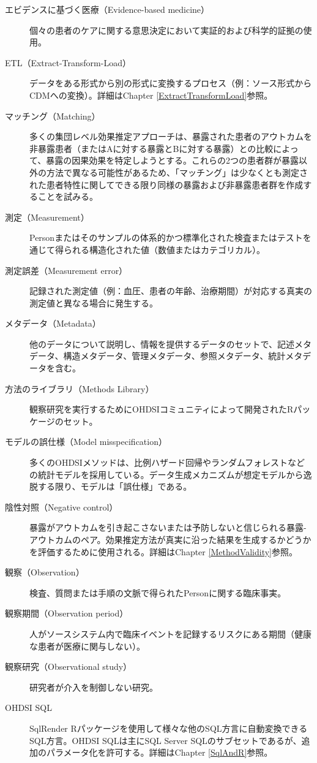 \documentclass[
  11pt]{book}
\theoremstyle{definition}
\theoremstyle{definition}
\theoremstyle{definition}
\theoremstyle{definition}
\theoremstyle{remark}
\begin{document}
\begin{description}
\item[エビデンスに基づく医療（Evidence-based medicine）]
個々の患者のケアに関する意思決定において実証的および科学的証拠の使用。
\item[ETL（Extract-Transform-Load）]
データをある形式から別の形式に変換するプロセス（例：ソース形式からCDMへの変換）。詳細はChapter \ref{ExtractTransformLoad}参照。
\item[マッチング（Matching）]
多くの集団レベル効果推定アプローチは、暴露された患者のアウトカムを非暴露患者（またはAに対する暴露とBに対する暴露）との比較によって、暴露の因果効果を特定しようとする。これらの2つの患者群が暴露以外の方法で異なる可能性があるため、「マッチング」は少なくとも測定された患者特性に関してできる限り同様の暴露および非暴露患者群を作成することを試みる。
\item[測定（Measurement）]
Personまたはそのサンプルの体系的かつ標準化された検査またはテストを通じて得られる構造化された値（数値またはカテゴリカル）。
\item[測定誤差（Measurement error）]
記録された測定値（例：血圧、患者の年齢、治療期間）が対応する真実の測定値と異なる場合に発生する。
\item[メタデータ（Metadata）]
他のデータについて説明し、情報を提供するデータのセットで、記述メタデータ、構造メタデータ、管理メタデータ、参照メタデータ、統計メタデータを含む。
\item[方法のライブラリ（Methods Library）]
観察研究を実行するためにOHDSIコミュニティによって開発されたRパッケージのセット。
\item[モデルの誤仕様（Model misspecification）]
多くのOHDSIメソッドは、比例ハザード回帰やランダムフォレストなどの統計モデルを採用している。データ生成メカニズムが想定モデルから逸脱する限り、モデルは「誤仕様」である。
\item[陰性対照（Negative control）]
暴露がアウトカムを引き起こさないまたは予防しないと信じられる暴露-アウトカムのペア。効果推定方法が真実に沿った結果を生成するかどうかを評価するために使用される。詳細はChapter \ref{MethodValidity}参照。
\item[観察（Observation）]
検査、質問または手順の文脈で得られたPersonに関する臨床事実。
\item[観察期間（Observation period）]
人がソースシステム内で臨床イベントを記録するリスクにある期間（健康な患者が医療に関与しない）。
\item[観察研究（Observational study）]
研究者が介入を制御しない研究。
\item[OHDSI SQL]
SqlRender Rパッケージを使用して様々な他のSQL方言に自動変換できるSQL方言。OHDSI SQLは主にSQL Server SQLのサブセットであるが、追加のパラメータ化を許可する。詳細はChapter \ref{SqlAndR}参照。

\end{description}
\end{document}
